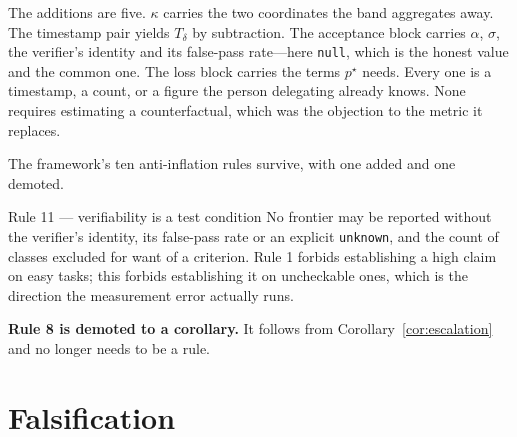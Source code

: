 \documentclass[11pt]{article}
\theoremstyle{definition}
\newcommand{\Td}{\ensuremath{T_\delta}}
\newcommand{\pstar}{\ensuremath{p^{\star}}}
\newcommand{\kap}{\ensuremath{\kappa}}
\begin{document}
The additions are five. \kap{} carries the two coordinates the band aggregates away. The timestamp pair yields \Td{} by subtraction. The acceptance block carries $\alpha$, $\sigma$, the verifier's identity and its false-pass rate---here \texttt{null}, which is the honest value and the common one. The loss block carries the terms \pstar{} needs. Every one is a timestamp, a count, or a figure the person delegating already knows. None requires estimating a counterfactual, which was the objection to the metric it replaces.

The framework's ten anti-inflation rules survive, with one added and one demoted.

\begin{claimbox}{Rule 11 --- verifiability is a test condition}
No frontier may be reported without the verifier's identity, its false-pass rate or an explicit \texttt{unknown}, and the count of classes excluded for want of a criterion. Rule 1 forbids establishing a high claim on easy tasks; this forbids establishing it on uncheckable ones, which is the direction the measurement error actually runs.

\medskip
\textbf{Rule 8 is demoted to a corollary.} It follows from Corollary~\ref{cor:escalation} and no longer needs to be a rule.
\end{claimbox}

\section{Falsification}
\end{document}
